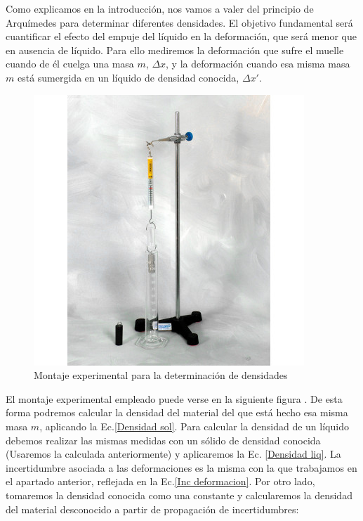 \documentclass[a4paper,12pt,titlepage]{article}
\begin{document}
Como explicamos en la introducción, nos vamos a valer del principio de Arquímedes para determinar diferentes densidades. El objetivo fundamental será cuantificar el efecto del empuje del líquido en la deformación, que será menor que en ausencia de líquido. Para ello mediremos la deformación que sufre el muelle cuando de él cuelga una masa $m$, $\Delta x$, y la deformación cuando esa misma masa $m$ está sumergida en un líquido de densidad conocida, $\Delta x'$. 

\newpage

\begin{figure}
    \centering
    \includegraphics[width=0.95\linewidth]{Images/hooke+arquimedes.jpg}
    \caption{Montaje experimental para la determinación de densidades}
    \label{Hooke+arquimedes}
\end{figure}

El montaje experimental empleado puede verse en la siguiente figura . De esta forma podremos calcular la densidad del material del que está hecho esa misma masa $m$, aplicando la Ec.\ref{Densidad sol}. Para calcular la densidad de un líquido debemos realizar las mismas medidas con un sólido de densidad conocida (Usaremos la calculada anteriormente) y aplicaremos la Ec. \ref{Densidad liq}. La incertidumbre asociada a las deformaciones es la misma con la que trabajamos en el apartado anterior, reflejada en la Ec.\ref{Inc deformacion}. Por otro lado, tomaremos la densidad conocida como una constante y calcularemos la densidad del material desconocido a partir de propagación de incertidumbres:
\end{document}
